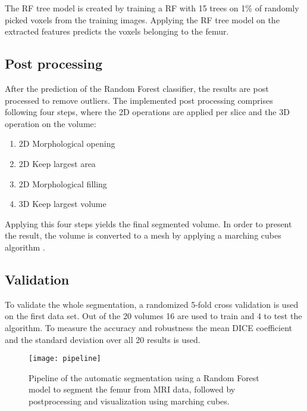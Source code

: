 The RF tree model is created by training a RF with 15 trees on 1\% of randomly picked voxels from the training images. Applying the RF tree model on the extracted features predicts the voxels belonging to the femur.
\subsection{Post processing}
After the prediction of the Random Forest classifier, the results are post processed to remove outliers. The implemented post processing comprises following four steps, where the 2D operations are applied per slice and the 3D operation on the volume:
\begin{enumerate}
\item 2D Morphological opening
\item 2D Keep largest area
\item 2D Morphological filling
\item 3D Keep largest volume
\end{enumerate}
Applying this four steps yields the final segmented volume. In order to present the result, the volume is converted to a mesh by applying a marching cubes algorithm \cite{lorensen}. 
\subsection{Validation}
To validate the whole segmentation, a randomized 5-fold cross validation \cite{cross} is used on the first data set. Out of the 20 volumes 16 are used to train and 4 to test the algorithm. To measure the accuracy and robustness the mean DICE coefficient\cite{powers2011evaluation} and the standard deviation over all 20 results is used.
\begin{figure*}[!t]
\centering
\texttt{[image: pipeline]}
\caption{Pipeline of the automatic segmentation using a Random Forest model to segment the femur from MRI data, followed by postprocessing and visualization using marching cubes.}
\label{fig:pipeline}
\end{figure*}

